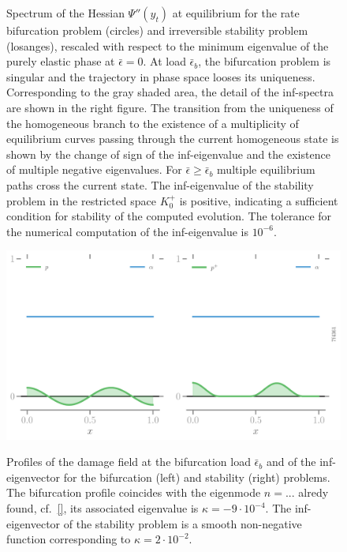 

\begin{figure}[htbp]
    \centering
    \caption{Spectrum of the Hessian $\Psi''(y_t)$ at equilibrium for the rate bifurcation problem (circles) and irreversible stability problem (losanges), rescaled with respect to the minimum eigenvalue of the purely elastic phase at $\bar \epsilon = 0$. At load $\bar \epsilon_b$, the bifurcation problem is singular and the trajectory in phase space looses its uniqueness. 
    Corresponding to the gray shaded area, the detail of the inf-spectra are shown in the right figure. The transition from the uniqueness of the homogeneous branch to the existence of a multiplicity of equilibrium curves passing through the current homogeneous state is shown by the change of sign of the inf-eigenvalue and the existence of multiple negative eigenvalues. For $\bar \epsilon \geq \bar \epsilon_b$ multiple equilibrium paths cross the current state. The inf-eigenvalue of the stability problem in the restricted space $K^+_0$ is positive, indicating a sufficient condition for stability of the computed evolution. The tolerance for the numerical computation of the inf-eigenvalue is $10^{-6}$.}
    \label{fig:irreversibility}
\end{figure}


\begin{figure}[htbp]
    \centering
    \includegraphics*[width=.95\textwidth]{../images/profiles-bif-stab-7f4361886184f3c6791fe16bf4f4b3f2.pdf}
    \label{fig:irreversibility}
    \caption{Profiles of the damage field at the bifurcation load $\bar \epsilon_b$ and of the inf-eigenvector for the bifurcation (left) and stability (right) problems. The bifurcation profile coincides with the eigenmode $n=...$ alredy found, cf.~\eqref{}, its associated eigenvalue is $\kappa = -9\cdot 10^{-4}$. The inf-eigenvector of the stability problem is a smooth non-negative function corresponding to $\kappa=2\cdot 10^{-2}$.}
\end{figure}

